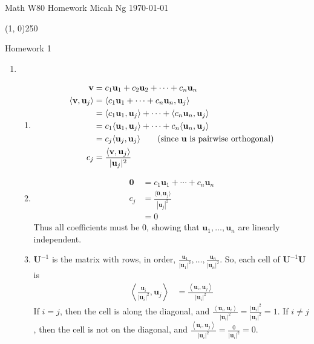 \documentclass[11pt,letterpaper]{article}
\begin{document}
\noindent
Math W80 Homework \hfill Micah Ng \hfill \today

\begin{center}
\line(1, 0){250}
\end{center}

\noindent
Homework 1

\begin{enumerate}
\item
  \begin{enumerate}
  \item
    \begin{align*}
      \mathbf{v} &= c_1\mathbf{u}_1+c_2\mathbf{u}_2+\cdots+c_n\mathbf{u}_n \\
      \langle\mathbf{v}, \mathbf{u}_j\rangle &= \langle c_1\mathbf{u}_1+\cdots+c_n\mathbf{u}_n, \mathbf{u}_j\rangle \\
          &= \langle c_1\mathbf{u}_1, \mathbf{u}_j\rangle+\cdots+\langle c_n\mathbf{u}_n, \mathbf{u}_j\rangle \\
          &= c_1\langle\mathbf{u}_1, \mathbf{u}_j\rangle+\cdots+c_n\langle\mathbf{u}_n, \mathbf{u}_j\rangle \\
          &= c_j\langle\mathbf{u}_j, \mathbf{u}_j\rangle \tag{since $\mathbf{u}$ is pairwise orthogonal} \\
      c_j &= \frac{\langle\mathbf{v}, \mathbf{u}_j\rangle}{|\mathbf{u}_j|^2}
    \end{align*}

  \item
    \begin{align*}
      \mathbf{0} &= c_1\mathbf{u}_1+\cdots+c_n\mathbf{u}_n \\
      c_j &= \frac{\langle\mathbf{0}, \mathbf{u}_j\rangle}{|\mathbf{u}_j|^2} \\
          &= 0
    \end{align*}
    Thus all coefficients must be 0, showing that
    $\mathbf{u}_1,\ldots,\mathbf{u}_n$ are linearly independent.

  \item
    $\mathbf{U}^{-1}$ is the matrix with rows, in order,
    $\frac{\mathbf{u}_1}{|\mathbf{u}_1|^2},\ldots,\frac{\mathbf{u}_n}{|\mathbf{u}_n|^2}$.
    So, each cell of $\mathbf{U}^{-1}\mathbf{U}$ is
    \begin{align*}
      \left\langle\frac{\mathbf{u}_i}{|\mathbf{u}_i|^2},\mathbf{u}_j\right\rangle
          &= \frac{\left\langle\mathbf{u}_i,\mathbf{u}_j\right\rangle}{|\mathbf{u}_i|^2}
    \end{align*}
    If $i=j$, then the cell is along the diagonal, and
    $\frac{\left\langle\mathbf{u}_i,\mathbf{u}_i\right\rangle}{|\mathbf{u}_i|^2}=\frac{|\mathbf{u}_i|^2}{|\mathbf{u}_i|^2}=1$.
    If $i\neq j$, then the cell is not on the diagonal, and
    $\frac{\left\langle\mathbf{u}_i,\mathbf{u}_j\right\rangle}{|\mathbf{u}_i|^2}=\frac{0}{|\mathbf{u}_i|^2}=0$.


\end{enumerate}
\end{enumerate}
\end{document}
